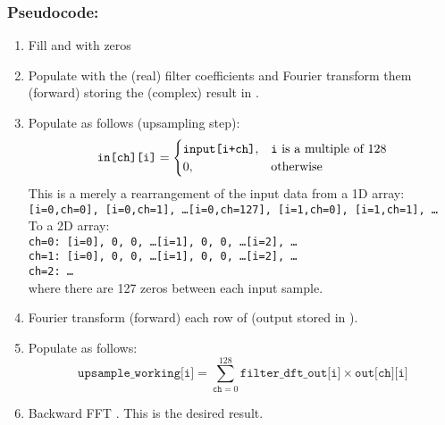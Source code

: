 \documentclass{article}
\begin{document}
\subsubsection*{Pseudocode:}

\begin{enumerate}
    \item Fill  and  with zeros
    \item Populate  with the (real) filter coefficients and Fourier transform them (forward) storing the (complex) result in .
    \item Populate  as follows (upsampling step):
        \begin{equation}
            \texttt{in[ch][i]} =
            \begin{cases}
                \texttt{input[i+ch]}, & \text{\texttt{i} is a multiple of 128} \\
                0, & \text{otherwise}
            \end{cases}
        \end{equation}
        This is a merely a rearrangement of the input data from a 1D array:\\[8pt]
        \texttt{[i=0,ch=0], [i=0,ch=1], \dots [i=0,ch=127], [i=1,ch=0], [i=1,ch=1], \dots}\\[8pt]
        To a 2D array:\\[8pt]
        \texttt{ch=0: [i=0], 0, 0, \dots [i=1], 0, 0, \dots [i=2], \dots}\\
        \texttt{ch=1: [i=0], 0, 0, \dots [i=1], 0, 0, \dots [i=2], \dots}\\
        \texttt{ch=2: \dots}\\[8pt]
        where there are 127 zeros between each input sample.
    \item Fourier transform (forward) each row of  (output stored in ).
    \item Populate  as follows:
        \begin{equation}
            \texttt{upsample\_working[i]}
              = \sum_{\texttt{ch}=0}^{128} \texttt{filter\_dft\_out[i]} \times \texttt{out[ch][i]}
        \end{equation}
    \item Backward FFT . This is the desired result.
\end{enumerate}

\end{document}
